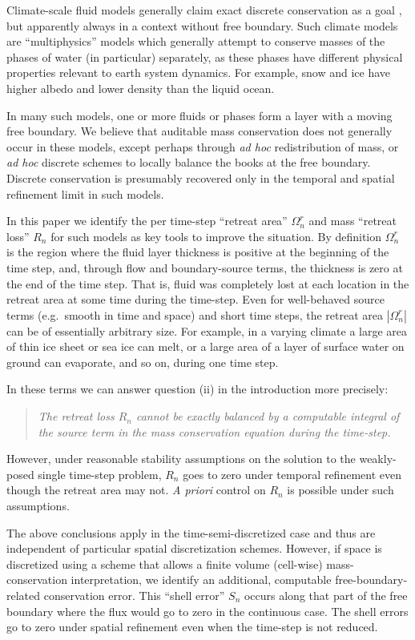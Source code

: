 \documentclass[final,leqno,onefignum,onetabnum]{siamltex1213bueler}
\begin{document}
Climate-scale fluid models generally claim exact discrete conservation as a goal \cite{Thuburn2008}, but apparently always in a context without free boundary.  Such climate models are ``multiphysics'' models which generally attempt to conserve masses of the phases of water (in particular) separately, as these phases have different physical properties relevant to earth system dynamics.  For example, snow and ice have higher albedo and lower density than the liquid ocean.

In many such models, one or more fluids or phases form a layer with a moving free boundary.  We believe that auditable mass conservation does not generally occur in these models, except perhaps through \emph{ad hoc} redistribution of mass, or \emph{ad hoc} discrete schemes to locally balance the books at the free boundary.  Discrete conservation is presumably recovered only in the temporal and spatial refinement limit in such models.

In this paper we identify the per time-step ``retreat area'' $\Omega_n^r$ and mass ``retreat loss'' $R_n$ for such models as key tools to improve the situation.  By definition $\Omega_n^r$ is the region where the fluid layer thickness is positive at the beginning of the time step, and, through flow and boundary-source terms, the thickness is zero at the end of the time step.  That is, fluid was completely lost at each location in the retreat area at some time during the time-step.  Even for well-behaved source terms (e.g.~smooth in time and space) and short time steps, the retreat area $|\Omega_n^r|$ can be of essentially arbitrary size.  For example, in a varying climate a large area of thin ice sheet or sea ice can melt, or a large area of a layer of surface water on ground can evaporate, and so on, during one time step.

In these terms we can answer question (ii) in the introduction more precisely:
\begin{quote}
  \emph{The retreat loss $R_n$ cannot be exactly balanced by a computable integral of the source term in the mass conservation equation during the time-step.}
\end{quote}
However, under reasonable stability assumptions on the solution to the weakly-posed single time-step problem,  $R_n$ goes to zero under temporal refinement even though the retreat area may not.  \emph{A priori} control on $R_n$ is possible under such assumptions.

The above conclusions apply in the time-semi-discretized case and thus are independent of particular spatial discretization schemes.  However, if space is discretized using a scheme that allows a finite volume (cell-wise) mass-conservation interpretation, we identify an additional, computable free-boundary-related conservation error.  This ``shell error'' $S_n$ occurs along that part of the free boundary where the flux would go to zero in the continuous case.  The shell errors go to zero under spatial refinement even when the time-step is not reduced.
\end{document}
